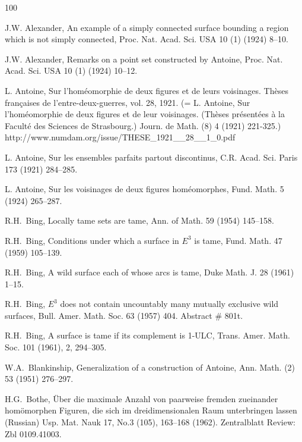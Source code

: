 \documentclass[12pt]{article}
\theoremstyle{definition}
\begin{document}
\begin{thebibliography}{100}


J.W. Alexander, An example of a simply connected
surface bounding a region which is not
simply connected,
Proc. Nat. Acad. Sci. USA 10 (1) (1924) 8--10.

J.W. Alexander,
Remarks on a point set constructed by Antoine,
Proc. Nat. Acad. Sci. USA 10 (1) (1924) 10--12.

L. Antoine,
Sur l'hom\'eomorphie de deux
figures
et de  leurs voisinages.
Th\`eses fran\c{c}aises de l'entre-deux-guerres,
vol. 28, 1921.
(=
L. Antoine,
Sur l'hom\'eomorphie de deux figures et de leur voisinages. (Th\`eses pr\'esent\'ees \`a la Facult\'e des Sciences de Strasbourg.)
Journ. de Math. (8) 4 (1921) 221-325.)\\
http://www.numdam.org/issue/THESE\_1921\_\_28\_\_1\_0.pdf


L. Antoine,
Sur les ensembles parfaits
partout discontinus,
C.R. Acad. Sci. Paris 173 (1921) 284--285.

L. Antoine,
Sur les voisinages de deux figures hom\'eomorphes,
Fund. Math. 5  (1924) 265--287.


R.H.~Bing,
Locally tame sets are tame,
Ann. of Math. 59 (1954) 145--158.


R.H.~Bing,
Conditions under which a surface in $E^3$ is tame,
Fund. Math. 47 (1959) 105--139.

R.H.~Bing,
A wild surface each of whose arcs is tame,
Duke Math. J. 28 (1961) 1--15.

R.H.~Bing,
$E^3$ does not contain
uncountably many mutually exclusive wild
surfaces, 
Bull. Amer. Math. Soc.
63 (1957) 404.
Abstract \# 801t.


R.H.~Bing,
A surface is tame if its complement is 1-ULC,
Trans. Amer. Math. Soc. 101 (1961), 2, 294--305.


W.A.~Blankinship,
Generalization of a construction of Antoine,
Ann. Math. (2) 53 (1951) 276--297.

H.G.~Bothe,
\"Uber die maximale Anzahl von paarweise fremden zueinander hom\"omorphen Figuren, die sich im dreidimensionalen Raum unterbringen lassen (Russian) Usp. Mat. Nauk 17, No.3 (105), 163--168 (1962). Zentralblatt Review: Zbl 0109.41003.


\end{thebibliography}
\end{document}
